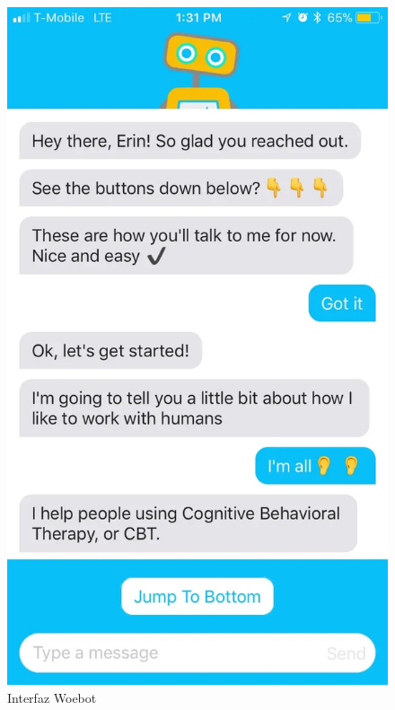 \begin{figure}[H]
    \centering
    \includegraphics[scale=0.15]{include/figuras/woebot.jpg}
    \caption{Interfaz Woebot}
    \label{fig:woebot}
\end{figure}


